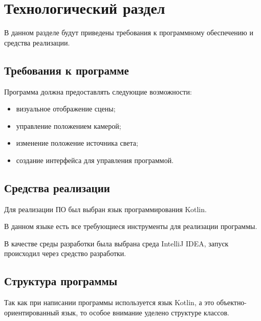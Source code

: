 \chapter{Технологический раздел}

В данном разделе будут приведены требования к программному обеспечению и средства реализации.


\section{Требования к программе} 
Программа должна предоставлять следующие возможности:
\begin{itemize}
	\item визуальное отображение сцены;
	\item управление положением камерой;
	\item изменение положение источника света;
	\item создание интерфейса для управления программой.
\end{itemize}

\section{Средства реализации} 
Для реализации ПО был выбран язык программирования Kotlin\cite{python}. 

В данном языке есть все требующиеся инструменты для реализации программы.

В качестве среды разработки была выбрана среда IntelliJ IDEA\cite{vscode}, запуск происходил через средство разработки.

\section{Структура программы}
Так как при написании программы используется язык Kotlin, а это объектно-ориентированный язык, то особое внимание уделено структуре классов.

